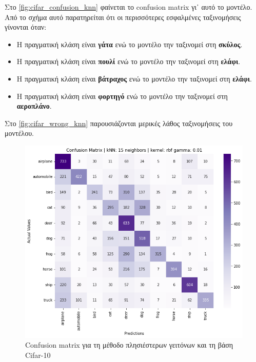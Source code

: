 \documentclass[a4paper]{article}
\begin{document}
Στο \autoref{fig:cifar_confusion_knn} φαίνεται το confusion matrix γι᾽ αυτό το
μοντέλο. Από το σχήμα αυτό παρατηρείται ότι οι περισσότερες εσφαλμένες
ταξινομήσεις γίνονται όταν:

\begin{itemize}
    \item Η πραγματική κλάση είναι {\bf γάτα} ενώ το μοντέλο την ταξινομεί στη
        {\bf σκύλος}.
    \item Η πραγματική κλάση είναι {\bf πουλί} ενώ το μοντέλο την ταξινομεί στη
        {\bf ελάφι}.
    \item Η πραγματική κλάση είναι {\bf βάτραχος} ενώ το μοντέλο την ταξινομεί
        στη {\bf ελάφι}.
    \item Η πραγματική κλάση είναι {\bf φορτηγό} ενώ το μοντέλο την ταξινομεί στη
        {\bf αεροπλάνο}.
\end{itemize}

Στο \autoref{fig:cifar_wrong_knn} παρουσιάζονται μερικές λάθος ταξινομήσεις του
μοντέλου.

\begin{figure}[H]
    \centering
    \includegraphics[width=0.6\linewidth]{cifar/confusion_matrix_knn.png}
    \caption{Confusion matrix για τη μέθοδο πλησιέστερων γειτόνων και τη βάση
    Cifar-10}
    \label{fig:cifar_confusion_knn}
\end{figure}
\end{document}
